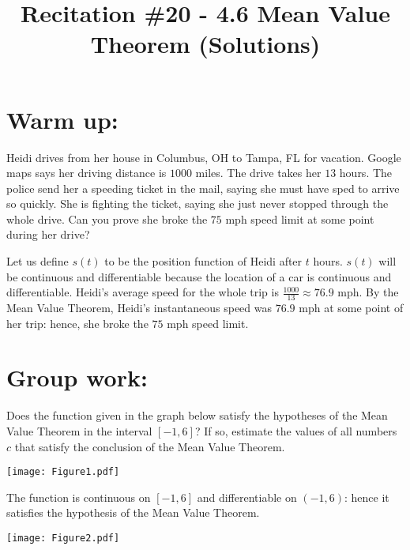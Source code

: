 \documentclass[nooutcomes]{ximera}
\title{Recitation \#20 - 4.6 Mean Value Theorem (Solutions)}
\begin{document}
\begin{abstract}		\end{abstract}
\maketitle

\section*{Warm up:} 
Heidi drives from her house in Columbus, OH to Tampa, FL for vacation.  Google maps says her driving distance is $1000$ miles.  The drive takes her $13$ hours.  The police send her a speeding ticket in the mail, saying she must have sped to arrive so quickly.  She is fighting the ticket, saying she just never stopped through the whole drive.  Can you prove she broke the $75$ mph speed limit at some point during her drive? 
		\begin{freeResponse}
		Let us define $s(t)$ to be the position function of Heidi after $t$ hours.  $s(t)$ will be continuous and differentiable because the location of a car is continuous and differentiable.  Heidi’s average speed for the whole trip is $\frac{1000}{13}\approx 76.9$ mph.  By the Mean Value Theorem, Heidi’s instantaneous speed was $76.9$ mph at some point of her trip: hence, she broke the $75$ mph speed limit.  
		\end{freeResponse}	
		
		
		

	
	
	
	
	

\section*{Group work:}



\begin{problem}
Does the function given in the graph below satisfy the hypotheses of the Mean Value Theorem in the interval $[-1,6]$?  If so, estimate the values of all numbers $c$ that satisfy the conclusion of the Mean Value Theorem.  
	\begin{image}
	\texttt{[image: Figure1.pdf]}
	\end{image}
	
		\begin{freeResponse}
		The function is continuous on $[-1,6]$ and differentiable on $(-1,6)$: hence it satisfies the hypothesis of the Mean Value Theorem.
			\begin{image}
			\texttt{[image: Figure2.pdf]}
			\end{image}
			
		\end{freeResponse}
		
		
		

\end{problem}
\end{document}
